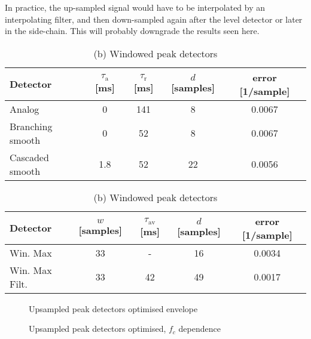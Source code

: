 \documentclass[../main2.tex]{subfiles}
\providecommand{\rootdir}{..}
\begin{document}
In practice, the up-sampled signal would have to be interpolated by an interpolating filter, and then down-sampled again after the level detector or later in the side-chain. This will probably downgrade the results seen here.

\begin{table}[h]
\begin{center}
\caption{Optimised parameters for the various peak detectors, $f_c=1000/\pi $, $f_m=2 $}
\label{tab:peak_det_opt_params_up}
\caption*{(a) Attack and release peak detectors}
\begin{tabular}{| l | c c c | c |}
	\hline
	Detector 	& $\tau_\text{a}$ [ms] & $\tau_\text{r}$ [ms] & $d$ [samples] & error [1/sample]\\
	\hline
	
	Analog 			& 0 			& 141 	& 8		& 0.0067	\\ 
	Branching smooth 	& 0	 		& 52 	& 8		& 0.0067	\\ 
	Cascaded smooth	& 1.8		& 52 	& 22		& 0.0056	\\
	\hline
\end{tabular}
\end{center}

\begin{center}
\caption*{(b) Windowed peak detectors}
\label{tab:peak_det_instatt_opt_params}
 \begin{tabular}{| l | c c c | c |}
	\hline
	Detector & $w$ [samples] & $\tau_\text{av}$ [ms] & $d$ [samples] & error [1/sample] \\
	\hline
	Win. Max		& 33		& -		& 16		& 0.0034	\\ 
	Win. Max Filt.	& 33		& 42		& 49		& 0.0017	\\
	\hline
\end{tabular}
\end{center}
\end{table}

\begin{figure}[h]
\centerline{}
\caption{Upsampled peak detectors optimised envelope}
\label{fig:peak_det_opt_env_th_up}
\end{figure}

\begin{figure}[h]
\centerline{}
\caption{Upsampled peak detectors optimised, $f_c$ dependence}
\label{fig:peak_det_opt_env_fc_dep_th_up}
\end{figure}
\end{document}
